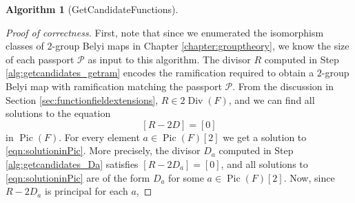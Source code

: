 \documentclass{dcthesis}
\newcommand{\wt}[1]{\widetilde{#1}}
\newcommand{\LL}{\mathscr L}
\DeclareMathOperator{\Div}{Div}
\DeclareMathOperator{\Pic}{Pic}
\DeclareMathOperator{\sat}{sat}
\numberwithin{equation}{section}
\theoremstyle{definition}
\newtheorem{alg}[equation]{Algorithm}
\theoremstyle{remark}
\begin{document}
{{{\begin{alg}[GetCandidateFunctions]
    \end{alg}
    \begin{proof}[Proof of correctness]
      First, note that since
      we enumerated the isomorphism
      classes of $2$-group Belyi maps
      in Chapter \ref{chapter:grouptheory},
      we know the size of each passport
      $\mathcal{P}$ as input to this algorithm.
      The divisor $R$ computed in
      Step \ref{alg:getcandidates_getram}
      encodes the ramification
      required to obtain a $2$-group Belyi map
      with ramification matching the
      passport $\mathcal{P}$.
      From the discussion
      in Section
      \ref{sec:functionfieldextensions},
      $R\in 2\Div(F)$,
      and we can find all solutions to
      the equation
      \begin{equation}
        \label{eqn:solutioninPic}
        [R-2D]=[0]
      \end{equation}
      in $\Pic(F)$.
      For every element $a\in\Pic(F)[2]$
      we get a solution
      to \eqref{eqn:solutioninPic}.
      More precisely, the divisor $D_a$
      computed in Step
      \ref{alg:getcandidates_Da}
      satisfies $[R-2D_a]=[0]$,
      and all solutions to
      \eqref{eqn:solutioninPic}
      are of the form $D_a$
      for some $a\in\Pic(F)[2]$.
      Now,
      since $R-2D_a$ is principal for each $a$,

\end{proof}}}}
\end{document}
